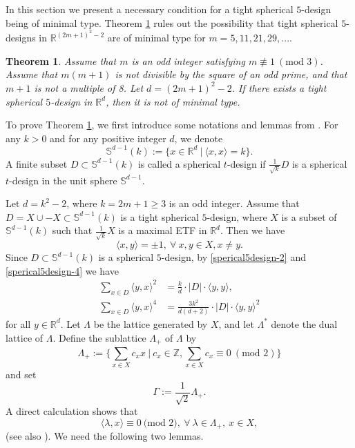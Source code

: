 \documentclass[11pt]{article}
\newtheorem{theorem}{Theorem}[section]
\theoremstyle{definition}
\theoremstyle{remark}
\begin{document}
In this section we present a necessary condition for a tight spherical $5$-design being of minimal type.
Theorem \ref{th1} rules out the possibility that tight spherical $5$-designs in $\mathbb{R}^{(2m+1)^2-2}$ are of minimal type for $m=5,11,21,29,...$. 

\begin{theorem}\label{th1}
Assume that $m$ is an odd integer satisfying $m\not\equiv1\ (\text{mod 3})$. Assume that $m(m+1)$ is not divisible by the square of an odd prime, and that $m+1$ is not a multiple of 8. Let $d=(2m+1)^2-2$. If there exists a tight spherical $5$-design in $\mathbb{R}^d$, then it is not of minimal type.

\end{theorem}


To prove Theorem \ref{th1}, we first introduce some notations and lemmas from \cite{BMV04,NV13}.
For any $k>0$ and for any positive integer $d$, we denote
\begin{equation*}
\mathbb{S}^{d-1}(k):=\{x\in\mathbb{R}^d\ |\ \langle x,x\rangle={k}\}.	
\end{equation*}
A finite subset $D\subset \mathbb{S}^{d-1}(k)$ is called a spherical $t$-design if $\frac{1}{\sqrt{k}}D$ is a spherical $t$-design in the unit sphere $\mathbb{S}^{d-1}$. 

Let $d=k^2-2$, where $k=2m+1\geq 3$ is an odd integer.
Assume that $D=X\cup-X\subset\mathbb{S}^{d-1}(k)$ is a tight spherical $5$-design, where $X$ is a subset of $\mathbb{S}^{d-1}(k)$ such that $\frac{1}{\sqrt{k}} X$ is a maximal ETF in $\mathbb{R}^d$. Then we have
\begin{equation*}
\langle x,y\rangle=\pm 1,\ \forall\ x,y\in X, x\neq y.
\end{equation*}
Since $D\subset\mathbb{S}^{d-1}(k)$ is a spherical $5$-design, by \eqref{sperical5design-2} and \eqref{sperical5design-4} we have
\begin{subequations}
\begin{align}
\sum_{x\in D}\langle y,x \rangle^2&=\frac{k}{d}\cdot |D|\cdot \langle y,y \rangle,\label{sperical5design-23} \\
\sum_{x\in D}\langle y,x \rangle^4&=\frac{3k^2}{d(d+2)}\cdot |D|\cdot\langle y,y \rangle^2 \label{sperical5design-43}
\end{align}
\end{subequations}
for all $y\in\mathbb{R}^d$.
Let $\Lambda$ be the lattice generated by $X$, and let $\Lambda^*$ denote the dual lattice of $\Lambda$. 
Define the sublattice $\Lambda_+$ of $\Lambda$ by
\begin{equation*}
\Lambda_+:=\bigg \{\sum\limits_{x\in X}^{}c_{x}x\  |\  c_x\in\mathbb{Z},\sum\limits_{x\in X}c_x\equiv0\ (\text{mod 2}) \bigg \}
\end{equation*}
and set 
\begin{equation*}
\Gamma:=\frac{1}{\sqrt{2}}\Lambda_+.
\end{equation*}
A direct calculation shows that 
\begin{equation}
\langle \lambda,x\rangle\equiv0\ \text{(mod 2)}, \ \forall \ \lambda\in \Lambda_+,\ x\in X,\label{l+}
\end{equation}
(see also \cite[equation (21)]{BMV04}).
We need the following two lemmas.
\end{document}
